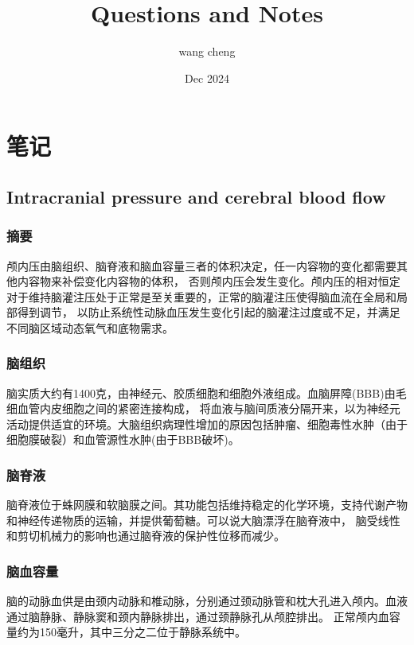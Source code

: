 \documentclass[titlepage,12pt]{article}
\title{Questions and Notes}
\author{wang cheng}
\date{Dec 2024}
\begin{document}
\maketitle

\section{笔记}
\subsection{Intracranial pressure and  cerebral blood flow}
\subsubsection{摘要}
颅内压由脑组织、脑脊液和脑血容量三者的体积决定，任一内容物的变化都需要其他内容物来补偿变化内容物的体积，
否则颅内压会发生变化。颅内压的相对恒定对于维持脑灌注压处于正常是至关重要的，正常的脑灌注压使得脑血流在全局和局部得到调节，
以防止系统性动脉血压发生变化引起的脑灌注过度或不足，并满足不同脑区域动态氧气和底物需求。
\subsubsection{脑组织}
脑实质大约有1400克，由神经元、胶质细胞和细胞外液组成。血脑屏障(BBB)由毛细血管内皮细胞之间的紧密连接构成，
将血液与脑间质液分隔开来，以为神经元活动提供适宜的环境。大脑组织病理性增加的原因包括肿瘤、细胞毒性水肿（由于细胞膜破裂）和血管源性水肿(由于BBB破坏)。
\subsubsection{脑脊液}
脑脊液位于蛛网膜和软脑膜之间。其功能包括维持稳定的化学环境，支持代谢产物和神经传递物质的运输，并提供葡萄糖。可以说大脑漂浮在脑脊液中，
脑受线性和剪切机械力的影响也通过脑脊液的保护性位移而减少。
\subsubsection{脑血容量}
脑的动脉血供是由颈内动脉和椎动脉，分别通过颈动脉管和枕大孔进入颅内。血液通过脑静脉、静脉窦和颈内静脉排出，通过颈静脉孔从颅腔排出。
正常颅内血容量约为150毫升，其中三分之二位于静脉系统中。
\end{document}
